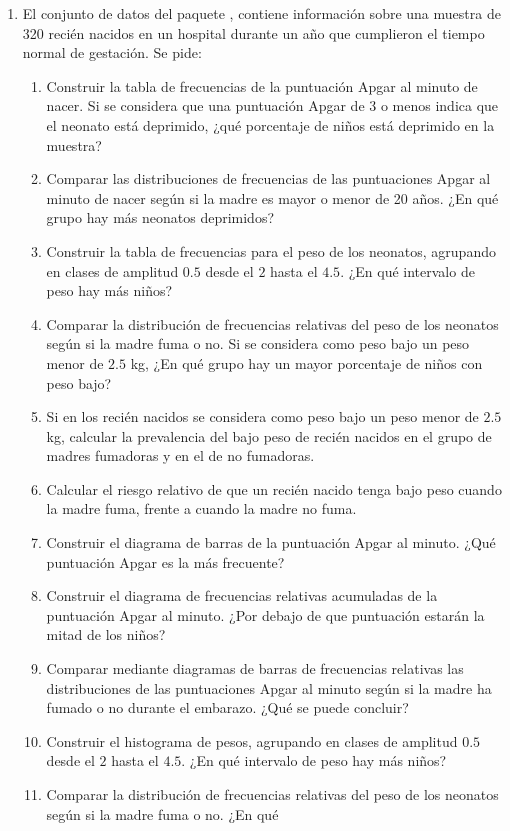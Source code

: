 \begin{enumerate}[leftmargin=*]
\item El conjunto de datos  del paquete , contiene información sobre una
muestra de 320 recién nacidos en un hospital durante un año que cumplieron el tiempo normal de gestación. 
Se pide:
\begin{enumerate}
\item Construir la tabla de frecuencias de la puntuación Apgar al minuto de nacer. 
Si se considera que una puntuación Apgar de 3 o menos indica que el neonato está deprimido, ¿qué porcentaje de niños está deprimido en la muestra?
\item Comparar las distribuciones de frecuencias de las puntuaciones Apgar al minuto de nacer según si la madre es mayor
o menor de 20 años.
¿En qué grupo hay más neonatos deprimidos?
\item Construir la tabla de frecuencias para el peso de los neonatos, agrupando en clases de amplitud $0.5$ desde el
$2$ hasta el $4.5$. ¿En qué intervalo de peso hay más niños?
\item Comparar la distribución de frecuencias relativas del peso de los neonatos según si la madre fuma o no. Si se
considera como peso bajo un peso menor de $2.5$ kg, ¿En qué grupo hay un mayor porcentaje de niños con peso bajo?
\item Si en los recién nacidos se considera como peso bajo un peso menor de $2.5$ kg, calcular la prevalencia del bajo
peso de recién nacidos en el grupo de madres fumadoras y en el de no fumadoras. 
\item Calcular el riesgo relativo de que un recién nacido tenga bajo peso cuando la madre fuma, frente a cuando la madre
no fuma. 
\item Construir el diagrama de barras de la puntuación Apgar al minuto. ¿Qué puntuación Apgar es la más frecuente? 
\item Construir el diagrama de frecuencias relativas acumuladas de la puntuación Apgar al minuto. ¿Por debajo de que puntuación estarán la mitad de los niños?
\item Comparar mediante diagramas de barras de frecuencias relativas las distribuciones de las puntuaciones Apgar al
minuto según si la madre ha fumado o no durante el embarazo. ¿Qué se puede concluir?
\item Construir el histograma de pesos, agrupando en clases de amplitud $0.5$ desde el $2$ hasta el $4.5$. ¿En qué
intervalo de peso hay más niños?
\item Comparar la distribución de frecuencias relativas del peso de los neonatos según si la madre fuma o no. ¿En qué

\end{enumerate}
\end{enumerate}
